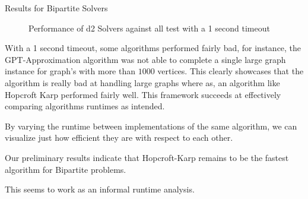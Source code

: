 \documentclass[final]{beamer}
\newlength{\onecolwid}
\begin{document}
\begin{columns}[t]
\begin{column}{\onecolwid}
\begin{block}{Results for Bipartite Solvers}
\begin{figure}[h]
\begin{center}
            \caption{Performance of d2 Solvers against all test with a 1 second timeout}
          \end{center}
        \end{figure}

      \noindent With a 1 second timeout, some algorithms performed fairly bad, for instance, the GPT-Approximation algorithm was not able to complete a single large graph instance for graph's with more than $1000$ vertices. This clearly showcases that the algorithm is really bad at handling large graphs where as, an algorithm like Hopcroft Karp performed fairly well. This framework succeeds at effectively comparing algorithms runtimes as intended. 

      By varying the runtime between implementations of the same algorithm, we can visualize just how efficient they are with respect to each other. 

      Our preliminary results indicate that Hopcroft-Karp remains to be the fastest algorithm for Bipartite problems. 
      
      This seems to work as an informal runtime analysis.

        
      \end{block}


      

        
        
          
            
            
            
            

\end{column}
\end{columns}
\end{document}

